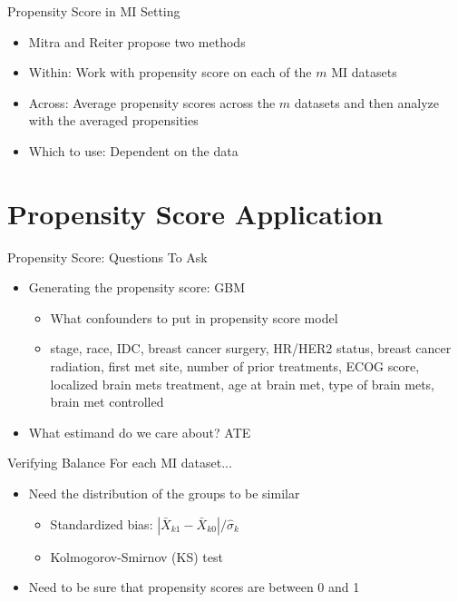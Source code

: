 \begin{frame}{Propensity Score in MI Setting}
\begin{itemize}
 \item Mitra and Reiter propose two methods \cite{Mitra2012}
 \item Within: Work with propensity score on each of the $m$ MI datasets
 \item Across: Average propensity scores across the $m$ datasets and then analyze with the averaged propensities
 \item Which to use: Dependent on the data
\end{itemize} 
\end{frame}

\section{Propensity Score Application}
\begin{frame}{Propensity Score: Questions To Ask}
\begin{itemize}
\item Generating the propensity score: GBM
\begin{itemize}
\item What confounders to put in propensity score model
  \item stage, race, IDC, breast cancer surgery, HR/HER2 status,
  breast cancer radiation, first met site, number of prior treatments, ECOG score,
  localized brain mets treatment, age at brain met, type of brain mets, brain met controlled
\end{itemize}
\item What estimand do we care about? ATE
\end{itemize} 
\end{frame}



\begin{frame}{Verifying Balance}
For each MI dataset...
\begin{itemize}
\item Need the distribution of the groups to be similar
\begin{itemize}
\item Standardized bias: $|\bar{X}_{k1}-\bar{X}_{k0}|/ \hat{\sigma}_k$
\item Kolmogorov-Smirnov (KS) test 
\end{itemize}
\item Need to be sure that propensity scores are between 0 and 1
\end{itemize}
\end{frame}



